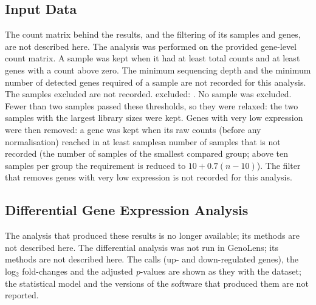 \subsection{Input Data}
The count matrix behind the results, and the filtering of its samples and genes, are not described here.
The analysis was performed on the provided gene-level count matrix.
A sample was kept when it had at least  total counts and at least  genes with a count above zero.
The minimum sequencing depth and the minimum number of detected genes required of a sample are not recorded for this analysis.
The samples excluded are not recorded.
  excluded: .
No sample was excluded.
Fewer than two samples passed these thresholds, so they were relaxed: the two samples with the largest library sizes were kept.
Genes with very low expression were then removed: a gene was kept when its raw counts (before any normalisation) reached  in at least  samplesa number of samples that is not recorded (the number of samples of the smallest compared group; above ten samples per group the requirement is reduced to $10 + 0.7 (n - 10)$).
The filter that removes genes with very low expression is not recorded for this analysis.

\subsection{Differential Gene Expression Analysis}

The analysis that produced these results is no longer available; its methods are not described here.
The differential analysis was not run in GenoLens; its methods are not described here.
The calls (up- and down-regulated genes), the log$_2$ fold-changes and the adjusted \textit{p}-values are shown as they  with the dataset; the statistical model and the versions of the software that produced them are not reported.

